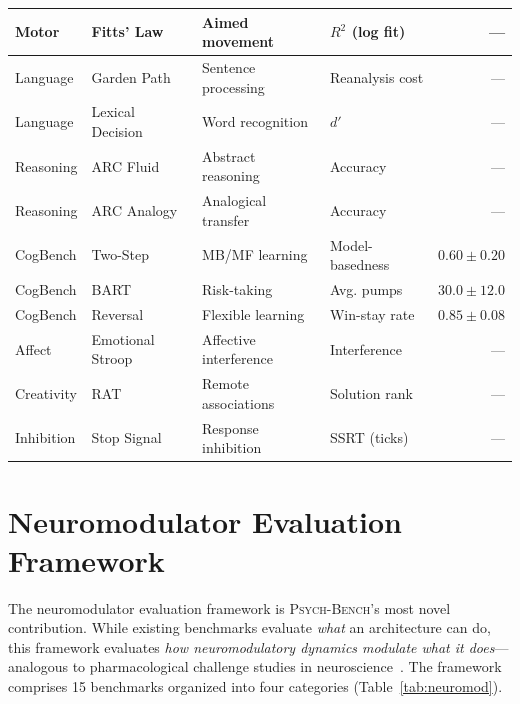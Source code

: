 \documentclass[11pt,letterpaper]{article}
\newcommand{\psychbench}{\textsc{Psych-Bench}}
\begin{document}
\begin{table}[p]
\begin{tabular}{@{}llllr@{}}
Motor & Fitts' Law & Aimed movement & $R^2$ (log fit) & --- \\
\midrule
Language & Garden Path & Sentence processing & Reanalysis cost & --- \\
Language & Lexical Decision & Word recognition & $d'$ & --- \\
\midrule
Reasoning & ARC Fluid & Abstract reasoning & Accuracy & --- \\
Reasoning & ARC Analogy & Analogical transfer & Accuracy & --- \\
\midrule
CogBench & Two-Step & MB/MF learning & Model-basedness & $0.60 \pm 0.20$ \\
CogBench & BART & Risk-taking & Avg. pumps & $30.0 \pm 12.0$ \\
CogBench & Reversal & Flexible learning & Win-stay rate & $0.85 \pm 0.08$ \\
\midrule
Affect & Emotional Stroop & Affective interference & Interference & --- \\
Creativity & RAT & Remote associations & Solution rank & --- \\
Inhibition & Stop Signal & Response inhibition & SSRT (ticks) & --- \\
\bottomrule
\end{tabular}
\end{table}

\section{Neuromodulator Evaluation Framework}
\label{sec:neuromod}

The neuromodulator evaluation framework is \psychbench{}'s most novel contribution. While existing benchmarks evaluate \emph{what} an architecture can do, this framework evaluates \emph{how neuromodulatory dynamics modulate what it does}---analogous to pharmacological challenge studies in neuroscience~\citep{doya2002metalearning}. The framework comprises 15 benchmarks organized into four categories (Table~\ref{tab:neuromod}).
\end{document}

